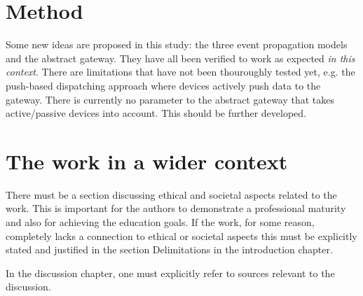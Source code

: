 \section{Method}
\label{sec:discussion-method}

Some new ideas are proposed in this study: the three event propagation models
and the abstract gateway. They have all been verified to work as expected
\textit{in this context}. There are limitations that have not been thouroughly
tested yet, e.g. the push-based dispatching approach where devices actively
push data to the gateway. There is currently no parameter to the abstract
gateway that takes active/passive devices into account. This should be further
developed.

\section{The work in a wider context}
\label{sec:work-wider-context}

There must be a section discussing ethical and societal
aspects related to the work. This is important for the authors
to demonstrate a professional maturity and also for achieving
the education goals. If the work, for some reason, completely
lacks a connection to ethical or societal aspects this must be
explicitly stated and justified in the section Delimitations in
the introduction chapter.

In the discussion chapter, one must explicitly refer to sources
relevant to the discussion.
